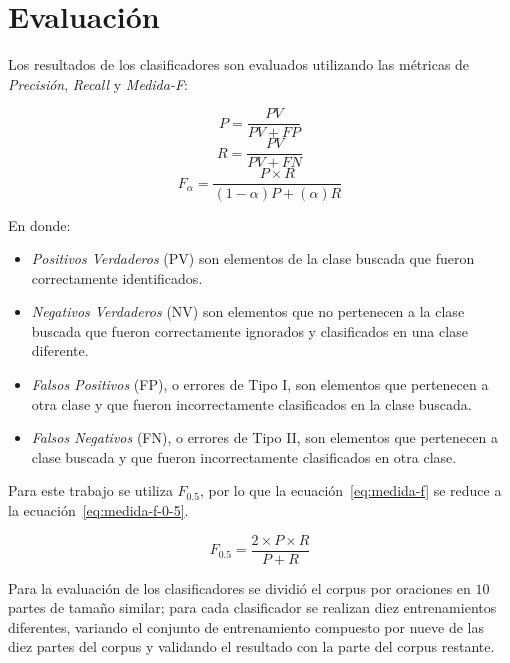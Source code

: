 \documentclass[runningheads,a4paper]{llncs}
\begin{document}
\section{Evaluación}
\label{sec:Resultados}

Los resultados de los clasificadores son evaluados utilizando las métricas de \emph{Precisión}, \emph{Recall} y \emph{Medida-F}\cite{BIRD09}:

\begin{equation}
	\label{eq:precision}
	P = \frac{PV}{PV + FP}
\end{equation}
\begin{equation}
	\label{eq:recall}
	R = \frac{PV}{PV + FN}
\end{equation}
\begin{equation}
	\label{eq:medida-f}
	F_{\alpha} = \frac{P \times R}{(1 - \alpha)P + (\alpha)R}
\end{equation}

En donde:
\begin{itemize}
\item{\emph{Positivos Verdaderos} (PV) son elementos de la clase buscada que fueron correctamente identificados.}
\item{\emph{Negativos Verdaderos} (NV) son elementos que no pertenecen a la clase buscada que fueron correctamente ignorados y clasificados en una clase diferente.}
\item{\emph{Falsos Positivos} (FP), o errores de Tipo I, son elementos que pertenecen a otra clase y que fueron incorrectamente clasificados en la clase buscada.}
\item{\emph{Falsos Negativos} (FN), o errores de Tipo II, son elementos que pertenecen a clase buscada y que fueron incorrectamente clasificados en otra clase.}
\end{itemize}

Para este trabajo se utiliza $F_{0.5}$\cite{MAKHOUL99}, por lo que la ecuación~\ref{eq:medida-f} se reduce a la ecuación~\ref{eq:medida-f-0-5}.

\begin{equation}
	\label{eq:medida-f-0-5}
	F_{0.5} = \frac{2 \times P \times R}{P + R}
\end{equation}

Para la evaluación de los clasificadores se dividió el corpus por oraciones en $10$ partes de tamaño similar; para cada clasificador se realizan diez entrenamientos diferentes, variando el conjunto de entrenamiento compuesto por nueve de las diez partes del corpus y validando el resultado con la parte del corpus restante. 
\end{document}
